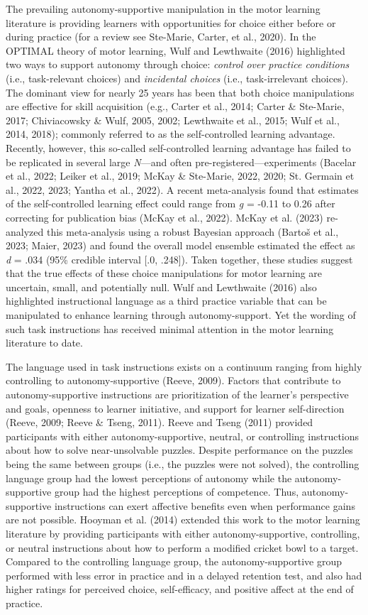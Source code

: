 \documentclass[
  man, donotrepeattitle,mask,floatsintext]{apa7}
\begin{document}
The prevailing autonomy-supportive manipulation in the motor learning literature is providing learners with opportunities for choice either before or during practice (for a review see Ste-Marie, Carter, et al., 2020). In the OPTIMAL theory of motor learning, Wulf and Lewthwaite (2016) highlighted two ways to support autonomy through choice: \emph{control over practice conditions} (i.e., task-relevant choices) and \emph{incidental choices} (i.e., task-irrelevant choices). The dominant view for nearly 25 years has been that both choice manipulations are effective for skill acquisition (e.g., Carter et al., 2014; Carter \& Ste-Marie, 2017; Chiviacowsky \& Wulf, 2005, 2002; Lewthwaite et al., 2015; Wulf et al., 2014, 2018); commonly referred to as the self-controlled learning advantage. Recently, however, this so-called self-controlled learning advantage has failed to be replicated in several large \emph{N}---and often pre-registered---experiments (Bacelar et al., 2022; Leiker et al., 2019; McKay \& Ste-Marie, 2022, 2020; St. Germain et al., 2022, 2023; Yantha et al., 2022). A recent meta-analysis found that estimates of the self-controlled learning effect could range from \emph{g} = -0.11 to 0.26 after correcting for publication bias (McKay et al., 2022). McKay et al. (2023) re-analyzed this meta-analysis using a robust Bayesian approach (Bartoš et al., 2023; Maier, 2023) and found the overall model ensemble estimated the effect as \emph{d} = .034 (95\% credible interval {[}.0, .248{]}). Taken together, these studies suggest that the true effects of these choice manipulations for motor learning are uncertain, small, and potentially null. Wulf and Lewthwaite (2016) also highlighted instructional language as a third practice variable that can be manipulated to enhance learning through autonomy-support. Yet the wording of such task instructions has received minimal attention in the motor learning literature to date.

The language used in task instructions exists on a continuum ranging from highly controlling to autonomy-supportive (Reeve, 2009). Factors that contribute to autonomy-supportive instructions are prioritization of the learner's perspective and goals, openness to learner initiative, and support for learner self-direction (Reeve, 2009; Reeve \& Tseng, 2011). Reeve and Tseng (2011) provided participants with either autonomy-supportive, neutral, or controlling instructions about how to solve near-unsolvable puzzles. Despite performance on the puzzles being the same between groups (i.e., the puzzles were not solved), the controlling language group had the lowest perceptions of autonomy while the autonomy-supportive group had the highest perceptions of competence. Thus, autonomy-supportive instructions can exert affective benefits even when performance gains are not possible. Hooyman et al. (2014) extended this work to the motor learning literature by providing participants with either autonomy-supportive, controlling, or neutral instructions about how to perform a modified cricket bowl to a target. Compared to the controlling language group, the autonomy-supportive group performed with less error in practice and in a delayed retention test, and also had higher ratings for perceived choice, self-efficacy, and positive affect at the end of practice.
\end{document}
